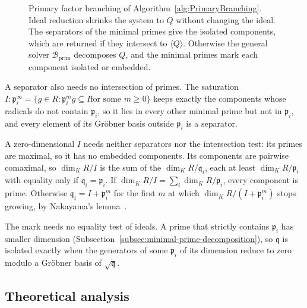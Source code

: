 \begin{figure}[pos=htbp]
  \centering
  \resizebox{0.79\textwidth}{!}{}
  \caption{Primary factor branching of Algorithm~\ref{alg:PrimaryBranching}.
    Ideal reduction shrinks the system to $Q$ without changing the ideal. The
    separators of the minimal primes give the isolated components, which are
    returned if they intersect to $\langle Q\rangle$. Otherwise the general
    solver $\mathcal B_{\mathrm{prim}}$ decomposes $Q$, and the minimal primes
  mark each component isolated or embedded.}
  \label{fig:primary_branching_flowchart}
\end{figure}

A separator also needs no intersection of primes. The saturation
$I:\mathfrak p_i^\infty=\{g\in R:\mathfrak p_i^mg\subseteq I\text{
for some }m\geq0\}$
keeps exactly the components whose radicals do not contain $\mathfrak p_i$,
so it lies in every other minimal prime but not in $\mathfrak p_i$, and every
element of its Gr\"obner basis outside $\mathfrak p_i$ is a separator.

A zero-dimensional $I$ needs neither separators nor the intersection test:
its primes are maximal, so it has no embedded components. Its components are
pairwise comaximal, so $\dim_K R/I$ is the sum of the $\dim_K R/\mathfrak q_i$,
each at least $\dim_K R/\mathfrak p_i$ with equality only if
$\mathfrak q_i=\mathfrak p_i$. If $\dim_KR/I=\sum_i\dim_KR/\mathfrak p_i$,
every component is prime. Otherwise $\mathfrak q_i=I+\mathfrak p_i^m$ for the
first $m$ at which $\dim_K R/(I+\mathfrak p_i^m)$ stops growing, by Nakayama's
lemma~\cite[Prop.~2.6]{atiyah1969introduction}.

The mark needs no equality test of ideals. A prime that strictly contains
$\mathfrak p_i$ has smaller dimension
(Subsection~\ref{subsec:minimal-prime-decomposition}), so $\mathfrak q$ is
isolated exactly when the generators of some $\mathfrak p_i$ of its dimension
reduce to zero modulo a Gr\"obner basis of $\sqrt{\mathfrak q}$.

\subsection{Theoretical analysis}
\label{subsec:ideal-branching-analysis}

